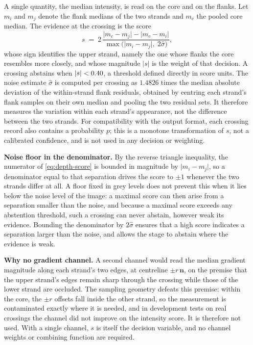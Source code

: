 A single quantity, the median intensity, is read on the core and on the
flanks. Let $m_i$ and $m_j$ denote the flank medians of the two strands and
$m_c$ the pooled core median. The evidence at the crossing is the score
\begin{equation}
  s \;=\; 2\,
  \frac{\lvert m_c-m_j\rvert-\lvert m_c-m_i\rvert}
       {\max\!\bigl(\lvert m_i-m_j\rvert,\;2\hat\sigma\bigr)},
  \label{eq:depth-score}
\end{equation}
whose sign identifies the upper strand, namely the one whose flanks the core
resembles more closely, and whose magnitude $\lvert s\rvert$ is the weight of
that decision. A crossing abstains when
$\lvert s\rvert<0.40{}$, a threshold defined directly in
score units. The noise estimate $\hat\sigma$ is computed per crossing as
$1.4826$ times the median absolute deviation of the within-strand flank
residuals, obtained by centring each strand's flank samples on their own
median and pooling the two residual sets. It therefore measures the variation
within each strand's appearance, not the difference between the two strands.
For compatibility with the output format, each crossing record also contains a
probability $p$; this is a monotone transformation of $s$, not a calibrated
confidence, and is not used in any decision or weighting.

\textbf{Noise floor in the denominator.} By the reverse triangle inequality,
the numerator of \eqref{eq:depth-score} is bounded in magnitude by
$\lvert m_i-m_j\rvert$, so a denominator equal to that separation drives the
score to $\pm1$ whenever the two strands differ at all. A floor fixed in grey
levels does not prevent this when it lies below the noise level of the image:
a maximal score can then arise from a separation smaller than the noise, and
because a maximal score exceeds any abstention threshold, such a crossing can
never abstain, however weak its evidence. Bounding the denominator by
$2\hat\sigma$ ensures that a high score indicates a separation larger than the
noise, and allows the stage to abstain where the evidence is weak.

\textbf{Why no gradient channel.} A second channel would read the median
gradient magnitude along each strand's two edges, at centreline
$\pm r\,\mathbf{n}$, on the premise that the upper strand's edges remain sharp
through the crossing while those of the lower strand are occluded. The
sampling geometry defeats this premise: within the core, the $\pm r$ offsets
fall inside the other strand, so the measurement is contaminated exactly where
it is needed, and in development tests on real crossings the channel did not
improve on the intensity score. It is therefore not used. With a single
channel, $s$ is itself the decision variable, and no channel weights or
combining function are required.

